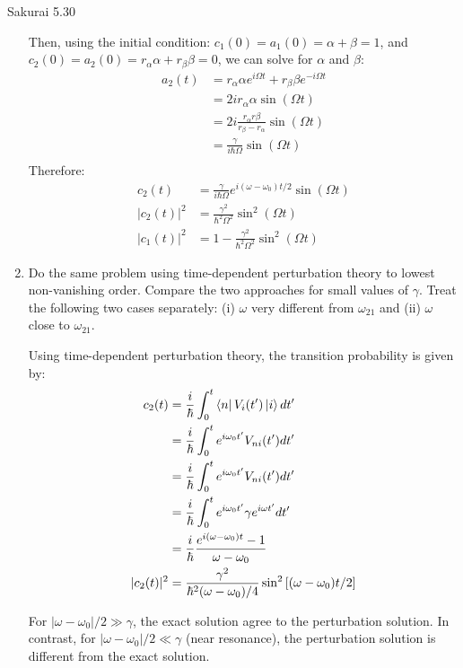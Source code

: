 \documentclass{article}
\begin{document}
\begin{section}{Sakurai 5.30}
\begin{enumerate}
\begin{tcolorbox}[breakable]
		Then, using the initial condition: $c_1(0) = a_1(0) = \alpha + \beta = 1$, and $c_2(0) = a_2(0) = r_\alpha \alpha + r_\beta \beta = 0$, we can solve for $\alpha$ and $\beta$:
		\begin{align*}
			a_2(t) & = r_\alpha \alpha e^{i \Omega t} + r_\beta \beta e^{-i \Omega t} \\
			       & = 2ir_\alpha \alpha \sin(\Omega t)                               \\
			       & = 2i \frac{r_\alpha r\beta}{r_\beta - r_\alpha} \sin(\Omega t)   \\
			       & = \frac{\gamma}{i \hbar \Omega} \sin(\Omega t)                   \\
		\end{align*}
		Therefore:
		\begin{align*}
			c_2(t)     & = \frac{\gamma}{i \hbar \Omega} e^{i (\omega - \omega_0)t/2} \sin(\Omega t) \\
			|c_2(t)|^2 & = \frac{\gamma^2}{\hbar^2 \Omega^2} \sin^2(\Omega t)                        \\
			|c_1(t)|^2 & = 1 - \frac{\gamma^2}{\hbar^2 \Omega^2} \sin^2(\Omega t)
		\end{align*}
	\end{tcolorbox}

	\item Do the same problem using time-dependent perturbation theory to lowest non-vanishing order. Compare the two approaches for small values of $\gamma$. Treat the following two cases separately: (i) $\omega$ very different from $\omega_{21}$ and (ii) $\omega$ close to $\omega_{21}$.

	\begin{tcolorbox}[breakable]
		Using time-dependent perturbation theory, the transition probability is given by:
		\begin{align*}
			c_2(t) & = \frac{i}{\hbar } \int_0^t \bra{n}V_i(t')\ket{i} dt' \\
			       & = \frac{i}{\hbar } \int_0^t e^{i \omega_0 t'} V_{ni}(t') dt' \\
			       & = \frac{i}{\hbar } \int_0^t e^{i \omega_0 t'} V_{ni}(t') dt' \\
			       & = \frac{i}{\hbar } \int_0^t e^{i \omega_0 t'} \gamma e^{i \omega t'} dt' \\
			       & = \frac{i}{\hbar } \frac{e^{i (\omega - \omega_0) t} - 1}{\omega - \omega_0} \\
			|c_2 (t)|^2 & = \frac{\gamma^2}{\hbar^2 (\omega - \omega_0)/4} \sin^2\left[ (\omega - \omega_0)t/2 \right] \\
		\end{align*}

		For $|\omega - \omega_0|/2 \gg \gamma$, the exact solution agree to the perturbation solution. In contrast, for $|\omega - \omega_0|/2 \ll \gamma$ (near resonance), the perturbation solution is different from the exact solution.
	\end{tcolorbox}
\end{enumerate}
\end{section}
\end{document}
